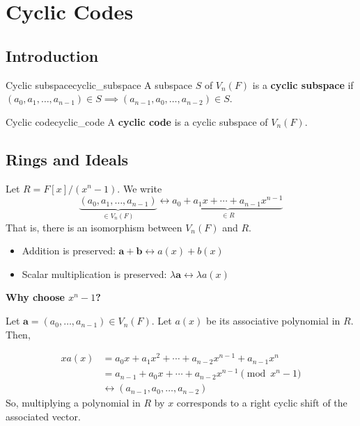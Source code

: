 \chapter{Cyclic Codes}
\section{Introduction}

\begin{Definition}{Cyclic subspace}{cyclic_subspace}
    A subspace $ S $ of $ V_n(F) $ is a \textbf{cyclic subspace}
    if $ (a_0,a_1,\ldots ,a_{n-1})\in S\implies
        (a_{n-1},a_0,\ldots , a_{n-2})\in S $.
\end{Definition}

\begin{Definition}{Cyclic code}{cyclic_code}
    A \textbf{cyclic code} is a cyclic subspace of $ V_n(F) $.
\end{Definition}

\section{Rings and Ideals}

Let $ R=F[x]/(x^n-1) $. We write
\[ \underbrace{(a_0,a_1,\ldots ,a_{n-1})}_{\in V_n(F)}
    \longleftrightarrow \underbrace{{a_0+a_1x+\cdots+a_{n-1}}x^{n-1}}_{\in R} \]
That is, there is an isomorphism between $ V_n(F) $ and $ R $.
\begin{itemize}
    \item Addition is preserved: $ \symbf{a}+\symbf{b}\longleftrightarrow a(x)+b(x) $
    \item Scalar multiplication is preserved: $ \lambda\symbf{a} \longleftrightarrow \lambda a(x) $
\end{itemize}
\textbf{Why choose $ x^n -1$?}

Let $ \symbf{a}=(a_0,\ldots ,a_{n-1})\in V_n(F) $. Let $ a(x) $ be its associative
polynomial in $ R $. Then,

\begin{align*}
    x a(x)
     & =a_0x+a_1x^2+\cdots+a_{n-2}x^{n-1}+a_{n-1}x^n     \\
     & =a_{n-1}+a_0x+\cdots+a_{n-2}x^{n-1} \pmod{x^n -1} \\
     & \longleftrightarrow (a_{n-1},a_0,\ldots ,a_{n-2})
\end{align*}
So, multiplying a polynomial in $ R $ by $ x $ corresponds
to a right cyclic shift of the associated vector.

